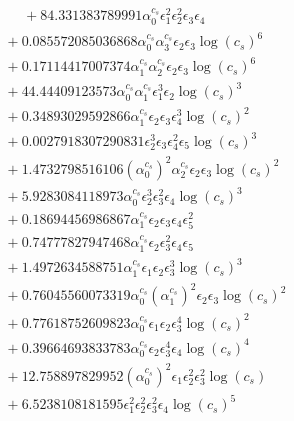 \documentclass[10pt]{article}
\begin{document}
\begin{align*}
\phantom{F_{s,7}} &\phantom{={}}{}  + 84.331383789991 \alpha_{0}^{c_s} \epsilon_{1}^{2} \epsilon_{2}^{2} \epsilon_{3} \epsilon_{4} \\
&{}  + 0.085572085036868 \alpha_{0}^{c_s} \alpha_{3}^{c_s} \epsilon_{2} \epsilon_{3} \log{\left(c_{s} \right)}^{6} \\
&{}  + 0.17114417007374 \alpha_{1}^{c_s} \alpha_{2}^{c_s} \epsilon_{2} \epsilon_{3} \log{\left(c_{s} \right)}^{6} \\
&{}  + 44.44409123573 \alpha_{0}^{c_s} \alpha_{1}^{c_s} \epsilon_{1}^{3} \epsilon_{2} \log{\left(c_{s} \right)}^{3} \\
&{}  + 0.34893029592866 \alpha_{1}^{c_s} \epsilon_{2} \epsilon_{3} \epsilon_{4}^{3} \log{\left(c_{s} \right)}^{2} \\
&{}  + 0.0027918307290831 \epsilon_{2}^{3} \epsilon_{3} \epsilon_{4}^{2} \epsilon_{5} \log{\left(c_{s} \right)}^{3} \\
&{}  + 1.4732798516106 \left(\alpha_{0}^{c_s}\right)^{2} \alpha_{2}^{c_s} \epsilon_{2} \epsilon_{3} \log{\left(c_{s} \right)}^{2} \\
&{}  + 5.9283084118973 \alpha_{0}^{c_s} \epsilon_{2}^{3} \epsilon_{3}^{2} \epsilon_{4} \log{\left(c_{s} \right)}^{3} \\
&{}  + 0.18694456986867 \alpha_{1}^{c_s} \epsilon_{2} \epsilon_{3} \epsilon_{4} \epsilon_{5}^{2} \\
&{}  + 0.74777827947468 \alpha_{1}^{c_s} \epsilon_{2} \epsilon_{3}^{2} \epsilon_{4} \epsilon_{5} \\
&{}  + 1.4972634588751 \alpha_{1}^{c_s} \epsilon_{1} \epsilon_{2} \epsilon_{3}^{3} \log{\left(c_{s} \right)}^{3} \\
&{}  + 0.76045560073319 \alpha_{0}^{c_s} \left(\alpha_{1}^{c_s}\right)^{2} \epsilon_{2} \epsilon_{3} \log{\left(c_{s} \right)}^{2} \\
&{}  + 0.77618752609823 \alpha_{0}^{c_s} \epsilon_{1} \epsilon_{2} \epsilon_{3}^{4} \log{\left(c_{s} \right)}^{2} \\
&{}  + 0.39664693833783 \alpha_{0}^{c_s} \epsilon_{2} \epsilon_{3}^{4} \epsilon_{4} \log{\left(c_{s} \right)}^{4} \\
&{}  + 12.758897829952 \left(\alpha_{0}^{c_s}\right)^{2} \epsilon_{1} \epsilon_{2}^{2} \epsilon_{3}^{2} \log{\left(c_{s} \right)} \\
&{}  + 6.5238108181595 \epsilon_{1}^{2} \epsilon_{2}^{2} \epsilon_{3}^{2} \epsilon_{4} \log{\left(c_{s} \right)}^{5} \\

\end{align*}
\end{document}
